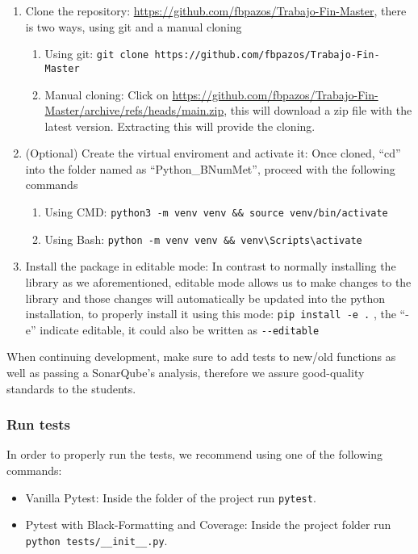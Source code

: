 \begin{enumerate}
       \item Clone the repository: \href{https://github.com/fbpazos/Trabajo-Fin-Master}{https://github.com/fbpazos/Trabajo-Fin-Master}, there is two ways, using git and a manual cloning
    \begin{enumerate}
        \item Using git: \lstinline|git clone https://github.com/fbpazos/Trabajo-Fin-Master|
        
        \item Manual cloning: Click on \href{https://github.com/fbpazos/Trabajo-Fin-Master/archive/refs/heads/main.zip}{https://github.com/fbpazos/Trabajo-Fin-Master/archive/refs/heads/main.zip}, this will download a zip file with the latest version. Extracting this will provide the cloning.
    \end{enumerate}

    \item (Optional) Create the virtual enviroment and activate it: Once cloned, ``cd'' into the folder named as ``Python\_BNumMet'', proceed with the following commands
    \begin{enumerate}
        \item Using CMD: \lstinline|python3 -m venv venv && source venv/bin/activate|
        \item Using Bash: \lstinline|python -m venv venv && venv\Scripts\activate|
    \end{enumerate}
    
    \item Install the package in editable mode: In contrast to normally installing the library as we aforementioned, editable mode allows us to make changes to the library and those changes will automatically be updated into the python installation, to properly install it using this mode: \lstinline|pip install -e .| , the ``-e'' indicate editable, it could also be written as \lstinline|--editable|

\end{enumerate}

When continuing development, make sure to add tests to new/old functions as well as passing a SonarQube's analysis, therefore we assure good-quality standards to the students.
\subsubsection*{Run tests}
In order to properly run the tests, we recommend using one of the following commands:
\begin{itemize}
    \item Vanilla Pytest: Inside the folder of the project run \lstinline|pytest|.
    \item Pytest with Black-Formatting and Coverage: Inside the project folder run \lstinline|python tests/__init__.py|.
\end{itemize}

